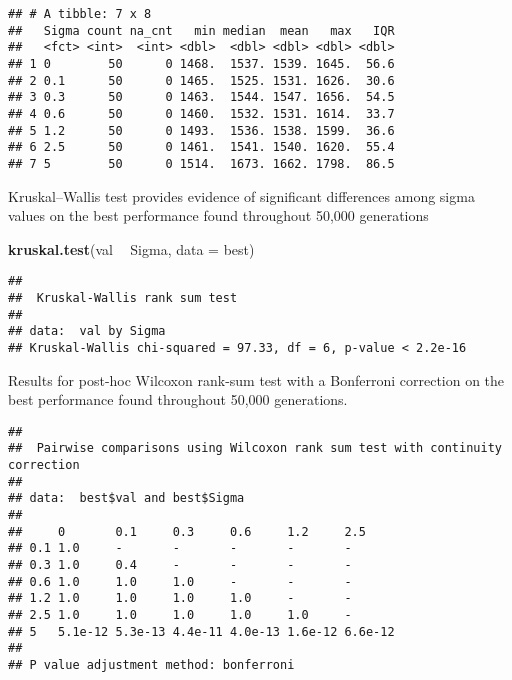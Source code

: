 \documentclass[]{book}
\newenvironment{Shaded}{\begin{snugshade}}{\end{snugshade}}
\newcommand{\DataTypeTok}[1]{\textcolor[rgb]{0.13,0.29,0.53}{#1}}
\newcommand{\KeywordTok}[1]{\textcolor[rgb]{0.13,0.29,0.53}{\textbf{#1}}}
\newcommand{\NormalTok}[1]{#1}
\newcommand{\OperatorTok}[1]{\textcolor[rgb]{0.81,0.36,0.00}{\textbf{#1}}}
\newcommand{\OtherTok}[1]{\textcolor[rgb]{0.56,0.35,0.01}{#1}}
\newcommand{\StringTok}[1]{\textcolor[rgb]{0.31,0.60,0.02}{#1}}
\begin{document}
\begin{verbatim}
## # A tibble: 7 x 8
##   Sigma count na_cnt   min median  mean   max   IQR
##   <fct> <int>  <int> <dbl>  <dbl> <dbl> <dbl> <dbl>
## 1 0        50      0 1468.  1537. 1539. 1645.  56.6
## 2 0.1      50      0 1465.  1525. 1531. 1626.  30.6
## 3 0.3      50      0 1463.  1544. 1547. 1656.  54.5
## 4 0.6      50      0 1460.  1532. 1531. 1614.  33.7
## 5 1.2      50      0 1493.  1536. 1538. 1599.  36.6
## 6 2.5      50      0 1461.  1541. 1540. 1620.  55.4
## 7 5        50      0 1514.  1673. 1662. 1798.  86.5
\end{verbatim}

Kruskal--Wallis test provides evidence of significant differences among sigma values on the best performance found throughout 50,000 generations

\begin{Shaded}
\begin{Highlighting}[]
\KeywordTok{kruskal.test}\NormalTok{(val }\OperatorTok{~}\StringTok{ }\NormalTok{Sigma, }\DataTypeTok{data =}\NormalTok{ best)}
\end{Highlighting}
\end{Shaded}

\begin{verbatim}
## 
##  Kruskal-Wallis rank sum test
## 
## data:  val by Sigma
## Kruskal-Wallis chi-squared = 97.33, df = 6, p-value < 2.2e-16
\end{verbatim}

Results for post-hoc Wilcoxon rank-sum test with a Bonferroni correction on the best performance found throughout 50,000 generations.

\begin{Shaded}
\end{Shaded}

\begin{verbatim}
## 
##  Pairwise comparisons using Wilcoxon rank sum test with continuity correction 
## 
## data:  best$val and best$Sigma 
## 
##     0       0.1     0.3     0.6     1.2     2.5    
## 0.1 1.0     -       -       -       -       -      
## 0.3 1.0     0.4     -       -       -       -      
## 0.6 1.0     1.0     1.0     -       -       -      
## 1.2 1.0     1.0     1.0     1.0     -       -      
## 2.5 1.0     1.0     1.0     1.0     1.0     -      
## 5   5.1e-12 5.3e-13 4.4e-11 4.0e-13 1.6e-12 6.6e-12
## 
## P value adjustment method: bonferroni
\end{verbatim}
\end{document}
